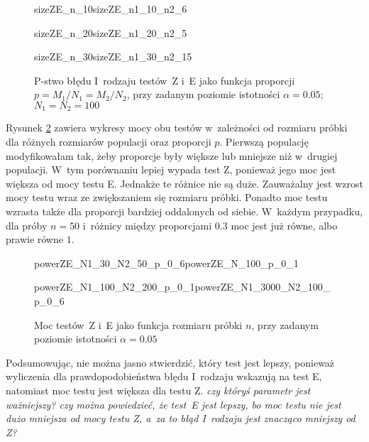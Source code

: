 \begin{figure}[!h]
	\begin{subdiagrams}{sizeZE_n_10}{sizeZE_n1_10_n2_6}
	\end{subdiagrams}
	
	\begin{subdiagrams}{sizeZE_n_20}{sizeZE_n1_20_n2_5}
	\end{subdiagrams}
	
	\begin{subdiagrams}{sizeZE_n_30}{sizeZE_n1_30_n2_15}
	\end{subdiagrams}
	\caption{P-stwo błędu I~rodzaju testów~Z i~E jako funkcja proporcji $p=M_1/N_1=M_2/N_2$, przy zadanym poziomie istotności $\alpha=0.05$; $N_1=N_2=100$}
	\label{sizeZE_p}
\end{figure}

Rysunek \ref{powerZE_n} zawiera wykresy mocy obu testów w~zależności od rozmiaru próbki dla różnych rozmiarów populacji oraz proporcji $p$. Pierwszą populację modyfikowałam tak, żeby proporcje były większe lub mniejsze niż w~drugiej populacji. W~tym porównaniu lepiej wypada test Z, ponieważ jego moc jest większa od mocy testu E. Jednakże te różnice nie są duże. Zauważalny jest wzrost mocy testu wraz ze zwiększaniem się rozmiaru próbki. Ponadto moc testu wzrasta także dla proporcji bardziej oddalonych od siebie. W~każdym przypadku, dla próby $n=50$ i~różnicy między proporcjami $0.3$ moc jest już równe, albo prawie równe $1$.

\begin{figure}[!h]
	\begin{subdiagrams}{powerZE_N1_30_N2_50_p_0_6}{powerZE_N_100_p_0_1}
	\end{subdiagrams}
	
	\begin{subdiagrams}{powerZE_N1_100_N2_200_p_0_1}{powerZE_N1_3000_N2_100_p_0_6}
	\end{subdiagrams}
	
	\caption{Moc testów~Z i~E jako funkcja rozmiaru próbki $n$, przy zadanym poziomie istotności $\alpha=0.05$}
	\label{powerZE_n}
\end{figure}

Podsumowując, nie można jasno stwierdzić, który test jest lepszy, ponieważ wyliczenia dla prawdopodobieństwa błędu I~rodzaju wskazują na test E, natomiast moc testu jest większa dla testu Z. \textit{czy któryś parametr jest ważniejszy? czy można powiedzieć, że test~E jest lepszy, bo moc testu nie jest dużo mniejsza od mocy testu Z, a~za to błąd I~rodzaju jest znacząco mniejszy od Z?}

